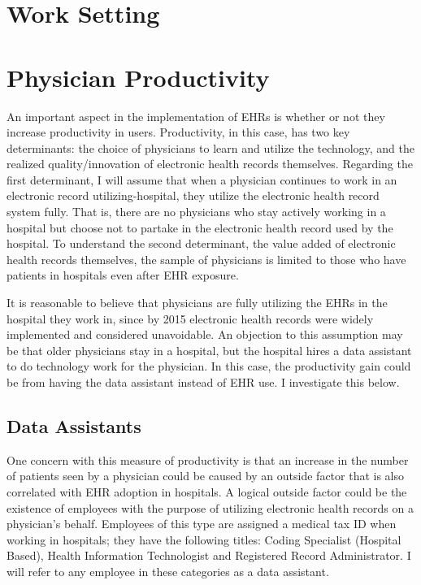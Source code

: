 \documentclass[11pt]{article}
\begin{document}
\newpage


\section{Work Setting}

\newpage

\section{Physician Productivity}

An important aspect in the implementation of EHRs is whether or not they increase productivity in users. Productivity, in this case, has two key determinants: the choice of physicians to learn and utilize the technology, and the realized quality/innovation of electronic health records themselves. Regarding the first determinant, I will assume that when a physician continues to work in an electronic record utilizing-hospital, they utilize the electronic health record system fully. That is, there are no physicians who stay actively working in a hospital but choose not to partake in the electronic health record used by the hospital. To understand the second determinant, the value added of electronic health records themselves, the sample of physicians is limited to those who have patients in hospitals even after EHR exposure. 

It is reasonable to believe that physicians are fully utilizing the EHRs in the hospital they work in, since by 2015 electronic health records were widely implemented and considered unavoidable. An objection to this assumption may be that older physicians stay in a hospital, but the hospital hires a data assistant to do technology work for the physician. In this case, the productivity gain could be from having the data assistant instead of EHR use. I investigate this below.

\subsection{Data Assistants}

One concern with this measure of productivity is that an increase in the number of patients seen by a physician could be caused by an outside factor that is also correlated with EHR adoption in hospitals. A logical outside factor could be the existence of employees with the purpose of utilizing electronic health records on a physician's behalf. Employees of this type are assigned a medical tax ID when working in hospitals; they have the following titles: Coding Specialist (Hospital Based), Health Information Technologist and Registered Record Administrator. I will refer to any employee in these categories as a data assistant. 
\end{document}
